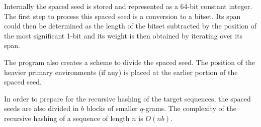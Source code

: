 Internally the spaced seed is stored and represented as a 64-bit constant integer. The first step to process this spaced seed is a conversion to a bitset. Its span could then be determined as the length of the bitset subtracted by the position of the most significant 1-bit and its weight is then obtained by iterating over its span.

The program also creates a scheme to divide the spaced seed. The position of the heavier primary environments (if any) is placed at the earlier portion of the spaced seed.

In order to prepare for the recursive hashing of the target sequences, the spaced seeds are also divided in $b$ blocks of smaller $q$-grams. The complexity of the recursive hashing of a sequence of length $n$ is $O(nb)$.